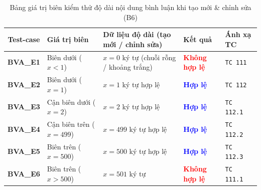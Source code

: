 \documentclass[11pt,a4paper]{article}
\begin{document}
\begin{table}[H]
\centering
\small
\begin{tabularx}{\textwidth}{|c|C{2.9cm}|X|C{2.4cm}|C{2.3cm}|}
\hline
{}
\textbf{Test-case} & \textbf{Giá trị biên} & \textbf{Dữ liệu độ dài (tạo mới / chỉnh sửa)} & \textbf{Kết quả} & \textbf{Ánh xạ TC} \tabularnewline
\hline
\textbf{BVA\_E1} & Biên dưới ($x < 1$) & $x = 0$ ký tự (chuỗi rỗng / khoảng trắng) & \textcolor{red}{\textbf{Không hợp lệ}} & \texttt{TC 111} \\ \hline
\textbf{BVA\_E2} & Biên dưới ($x = 1$) & $x = 1$ ký tự hợp lệ & \textcolor{blue}{\textbf{Hợp lệ}} & \texttt{TC 112} \\ \hline
\textbf{BVA\_E3} & Cận biên dưới ($x = 2$) & $x = 2$ ký tự hợp lệ & \textcolor{blue}{\textbf{Hợp lệ}} & \texttt{TC 112.1} \\ \hline
\textbf{BVA\_E4} & Cận biên trên ($x = 499$) & $x = 499$ ký tự hợp lệ & \textcolor{blue}{\textbf{Hợp lệ}} & \texttt{TC 112.2} \\ \hline
\textbf{BVA\_E5} & Biên trên ($x = 500$) & $x = 500$ ký tự hợp lệ & \textcolor{blue}{\textbf{Hợp lệ}} & \texttt{TC 112.3} \\ \hline
\textbf{BVA\_E6} & Biên trên ($x > 500$) & $x = 501$ ký tự & \textcolor{red}{\textbf{Không hợp lệ}} & \texttt{TC 111.1} \\ \hline
\end{tabularx}
\caption{Bảng giá trị biên kiểm thử độ dài nội dung bình luận khi tạo mới \& chỉnh sửa (B6)}
\end{table}
\end{document}
